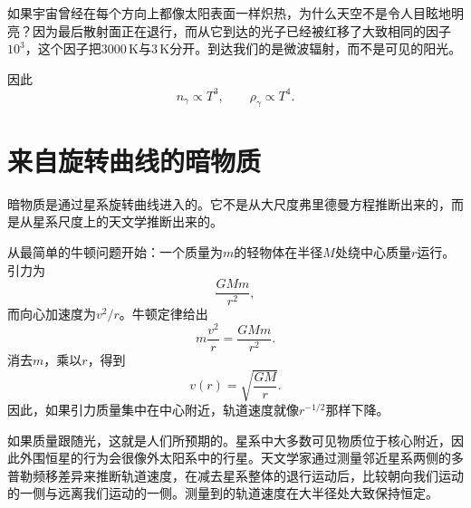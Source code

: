 如果宇宙曾经在每个方向上都像太阳表面一样炽热，为什么天空不是令人目眩地明亮？因为最后散射面正在退行，而从它到达的光子已经被红移了大致相同的因子\(10^3\)，这个因子把\(3000\,\mathrm K\)与\(3\,\mathrm K\)分开。到达我们的是微波辐射，而不是可见的阳光。

\begin{classroomqa}
\end{classroomqa}

\begin{classroomqa}
\end{classroomqa}

因此
\begin{equation}
n_\gamma\propto T^3,
\qquad
\rho_\gamma\propto T^4.
\end{equation}

\section{来自旋转曲线的暗物质}

暗物质是通过星系旋转曲线进入的。它不是从大尺度弗里德曼方程推断出来的，而是从星系尺度上的天文学推断出来的。

从最简单的牛顿问题开始：一个质量为\(m\)的轻物体在半径\(M\)处绕中心质量\(r\)运行。引力为
\begin{equation}
\frac{GMm}{r^2},
\end{equation}
而向心加速度为\(v^2/r\)。牛顿定律给出
\begin{equation}
m\frac{v^2}{r}=\frac{GMm}{r^2}.
\end{equation}
消去\(m\)，乘以\(r\)，得到
\begin{equation}
v(r)=\sqrt{\frac{GM}{r}}.
\end{equation}
因此，如果引力质量集中在中心附近，轨道速度就像\(r^{-1/2}\)那样下降。

如果质量跟随光，这就是人们所预期的。星系中大多数可见物质位于核心附近，因此外围恒星的行为会很像外太阳系中的行星。天文学家通过测量邻近星系两侧的多普勒频移差异来推断轨道速度，在减去星系整体的退行运动后，比较朝向我们运动的一侧与远离我们运动的一侧。测量到的轨道速度在大半径处大致保持恒定。

